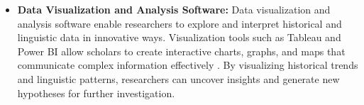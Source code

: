 \begin{itemize}
		\item \textbf{Data Visualization and Analysis Software:}
        Data visualization and analysis software enable researchers to explore and interpret historical and linguistic data in innovative ways. Visualization tools such as Tableau and Power BI allow scholars to create interactive charts, graphs, and maps that communicate complex information effectively \cite{Few}. By visualizing historical trends and linguistic patterns, researchers can uncover insights and generate new hypotheses for further investigation.
\end{itemize}